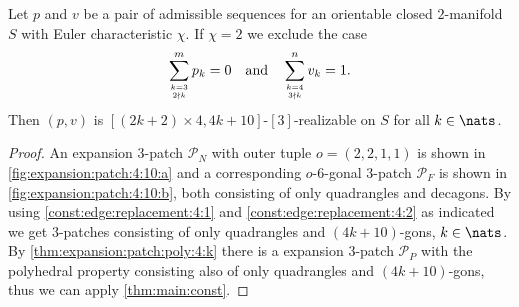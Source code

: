 \clearpage
\begin{theorem}
  Let $p$ and $v$ be a pair of admissible sequences for an orientable closed $2$-manifold $S$ with {\sc Euler} characteristic $\chi$. If $\chi = 2$ we exclude the case
  \begin{align*}
    \sum_{k=3 \atop 2 \nmid k}^{m} p_k = 0 \text{\quad and\quad}\sum_{k=4 \atop 3 \nmid k}^n v_k = 1.
  \end{align*}
  Then $(p, v)$ is $[(2k + 2) \times 4, 4k+10]$-$[3]$-realizable on $S$ for all $k \in \nats$.
  \begin{proof}
    An expansion $3$-patch $\mathcal{P}_N$ with outer tuple $o = (2, 2, 1, 1)$ is shown in \autoref{fig:expansion:patch:4:10:a} and a corresponding $o$-$6$-gonal $3$-patch $\mathcal{P}_F$ is shown in \autoref{fig:expansion:patch:4:10:b}, both consisting of only quadrangles and decagons. By using \autoref{const:edge:replacement:4:1} and \autoref{const:edge:replacement:4:2} as indicated we get $3$-patches consisting of only quadrangles and $(4k+10)$-gons, $k \in \nats$. By \autoref{thm:expansion:patch:poly:4:k} there is a expansion $3$-patch $\mathcal{P}_P$ with the polyhedral property consisting also of only quadrangles and $(4k+10)$-gons, thus we can apply \autoref{thm:main:const}.
  \end{proof}
\end{theorem}
{\par\vspace*{\fill}}

